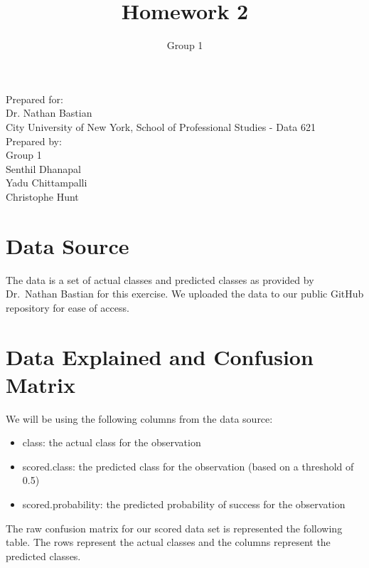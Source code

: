 \documentclass[]{article}
\title{Homework 2}
\author{Group 1}
\date{}
\providecommand{\tightlist}{%
  \setlength{\itemsep}{0pt}\setlength{\parskip}{0pt}}
\begin{document}
\maketitle

{
\setcounter{tocdepth}{2}
\tableofcontents
}
\begin{center}
\vspace*{\fill}
\bigskip
\bigskip
\bigskip
Prepared for:\\
\medskip
Dr. Nathan Bastian\\
\smallskip
City University of New York, School of Professional Studies - Data 621\\
\bigskip
Prepared by:\\
\medskip
Group 1\\ 
\medskip
Senthil Dhanapal\\ 
\smallskip
Yadu Chittampalli\\
\smallskip
Christophe Hunt\\  
\vspace*{\fill}
\end{center}

\newpage

\section{Data Source}\label{data-source}

The data is a set of actual classes and predicted classes as provided by
Dr.~Nathan Bastian for this exercise. We uploaded the data to our public
GitHub repository for ease of access.

\section{Data Explained and Confusion
Matrix}\label{data-explained-and-confusion-matrix}

We will be using the following columns from the data source:

\begin{itemize}
\tightlist
\item
  class: the actual class for the observation
\item
  scored.class: the predicted class for the observation (based on a
  threshold of 0.5)
\item
  scored.probability: the predicted probability of success for the
  observation
\end{itemize}

The raw confusion matrix for our scored data set is represented the
following table. The rows represent the actual classes and the columns
represent the predicted classes.
\end{document}
